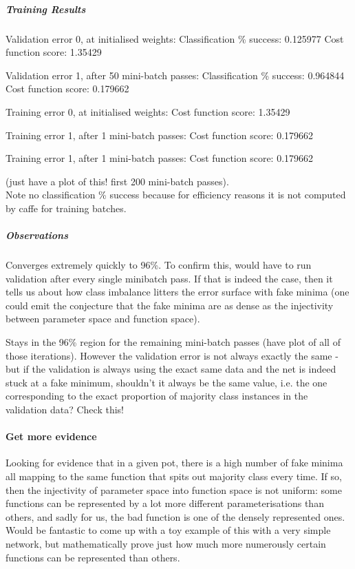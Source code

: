 \documentclass[a4paper,11pt]{article}
\begin{document}
\subparagraph{Training Results}

Validation error 0, at initialised weights:
Classification \% success: 0.125977
Cost function score: 1.35429

Validation error 1, after 50 mini-batch passes:
Classification \% success: 0.964844
Cost function score: 0.179662

Training error 0, at initialised weights:
Cost function score: 1.35429

Training error 1, after 1 mini-batch passes:
Cost function score: 0.179662

Training error 1, after 1 mini-batch passes:
Cost function score: 0.179662

(just have a plot of this! first 200 mini-batch passes). \\
Note no classification \% success because for efficiency reasons it is not computed by caffe for training batches.

\subparagraph{Observations}

Converges extremely quickly to 96\%. To confirm this, would have to run validation after every single minibatch pass. If that is indeed the case, then it tells us about how class imbalance litters the error surface with fake minima (one could emit the conjecture that the fake minima are as dense as the injectivity between parameter space and function space).

Stays in the 96\% region for the remaining mini-batch passes (have plot of all of those iterations). However the validation error is not always exactly the same - but if the validation is always using the exact same data and the net is indeed stuck at a fake minimum, shouldn't it always be the same value, i.e. the one corresponding to the exact proportion of majority class instances in the validation data? Check this!\\


\paragraph{Get more evidence}

Looking for evidence that in a given pot, there is a high number of fake minima all mapping to the same function that spits out majority class every time. If so, then the injectivity of parameter space into function space is not uniform: some functions can be represented by a lot more different parameterisations than others, and sadly for us, the bad function is one of the densely represented ones. Would be fantastic to come up with a toy example of this with a very simple network, but mathematically prove just how much more numerously certain functions can be represented than others. \\
\end{document}
